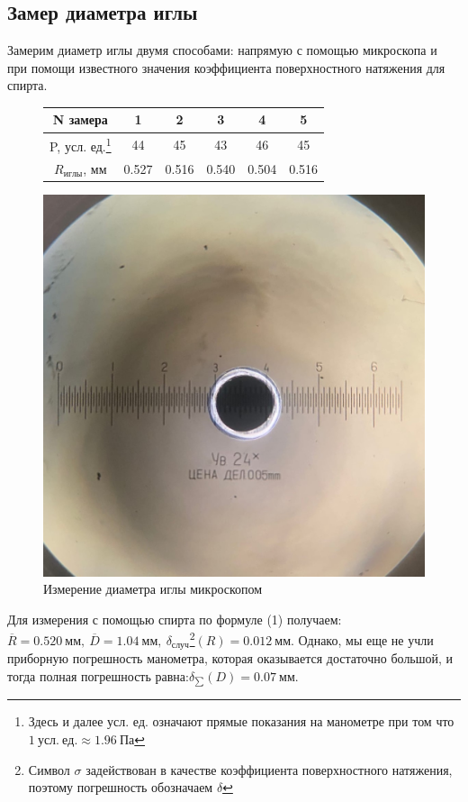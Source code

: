\documentclass[a4paper, 12pt]{article}%
\begin{document}
		\subsection{Замер диаметра иглы}
		Замерим диаметр иглы двумя способами: напрямую с помощью микроскопа и при помощи известного значения коэффициента поверхностного натяжения для спирта.
		\begin{figure}[H]
			\begin{center}
				\begin{minipage}[h]{0.48\linewidth}
					\centering
					\begin{tabular}{|c|c|c|c|c|c|}
						\hline
						N замера        & 1     & 2     & 3     & 4     & 5     \\ \hline
						P, усл. ед.\footnote{Здесь и далее усл. ед. означают прямые показания на манометре при том что $1~ усл.~ ед. \approx 1.96 ~Па $}     & 44    & 45    & 43    & 46    & 45    \\ \hline
						$R_{иглы}$, мм & 0.527 & 0.516 & 0.540 & 0.504 & 0.516 \\ \hline
					\end{tabular}
					\end{minipage}
				\hfill
				\begin{minipage}[h]{0.48\linewidth}
					\centering 
					\includegraphics[width=0.7\linewidth]{needle.jpg} 
					\caption{Измерение диаметра иглы микроскопом} 
				\end{minipage}
			\end{center}
		\end{figure}
		Для измерения с помощью спирта по формуле (1) получаем:\\ $ \overline{R}  = 0.520~мм,~\overline{D}  = 1.04~мм,~\delta_{случ}$\footnote{Символ $\sigma$ задействован в качестве коэффициента поверхностного натяжения, поэтому погрешность обозначаем $\delta$}$ (R) = 0.012~мм $. Однако, мы еще не учли приборную погрешность манометра, которая оказывается достаточно большой, и тогда полная погрешность равна:\newline $\delta_{\sum}(D)=0.07~ мм$.\\
\end{document}

